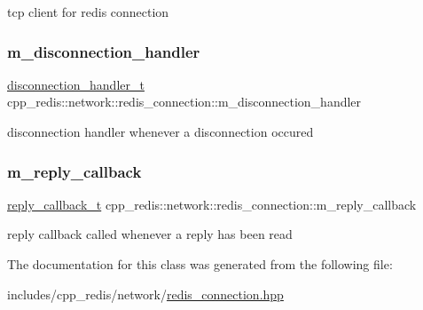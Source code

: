 tcp client for redis connection \mbox{\label{classcpp__redis_1_1network_1_1redis__connection_abd2b78a1df13fd04d0f50ee603c1fe8a}} 
\subsubsection{\texorpdfstring{m\+\_\+disconnection\+\_\+handler}{m\_disconnection\_handler}}
{\footnotesize\ttfamily \hyperlink{classcpp__redis_1_1network_1_1redis__connection_aba1a229a3d36a5540a80776ed0cf9a44}{disconnection\+\_\+handler\+\_\+t} cpp\+\_\+redis\+::network\+::redis\+\_\+connection\+::m\+\_\+disconnection\+\_\+handler\hspace{0.3cm}{\ttfamily [private]}}

disconnection handler whenever a disconnection occured \mbox{\label{classcpp__redis_1_1network_1_1redis__connection_a9e02ddcb9c3a82bbddc4dedb97f89527}} 
\subsubsection{\texorpdfstring{m\+\_\+reply\+\_\+callback}{m\_reply\_callback}}
{\footnotesize\ttfamily \hyperlink{classcpp__redis_1_1network_1_1redis__connection_a40f4b55a3103b7436e34211893377245}{reply\+\_\+callback\+\_\+t} cpp\+\_\+redis\+::network\+::redis\+\_\+connection\+::m\+\_\+reply\+\_\+callback\hspace{0.3cm}{\ttfamily [private]}}

reply callback called whenever a reply has been read 

The documentation for this class was generated from the following file\+:\begin{DoxyCompactItemize}
\item 
includes/cpp\+\_\+redis/network/\hyperlink{redis__connection_8hpp}{redis\+\_\+connection.\+hpp}\end{DoxyCompactItemize}
